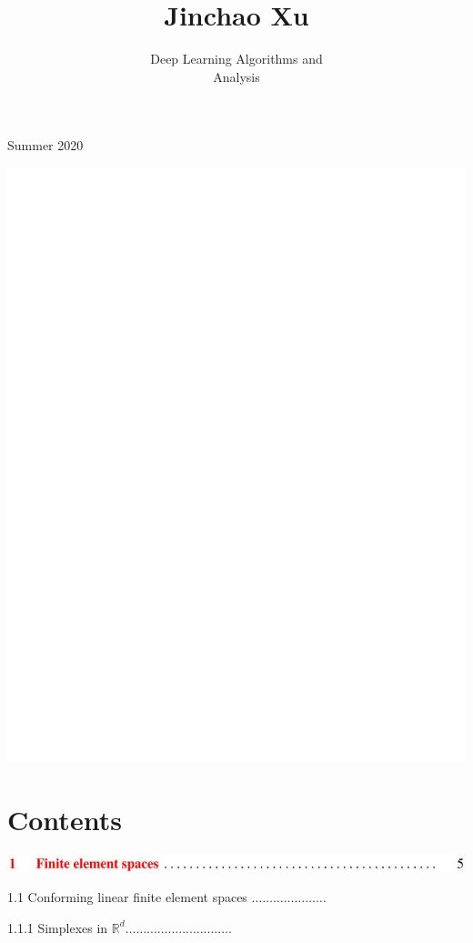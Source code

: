 \documentclass[10pt]{article}
\title{Jinchao Xu }
\author{Deep Learning Algorithms and\\
Analysis}
\date{}
\begin{document}
\maketitle

Summer 2020

\includegraphics[max width=\textwidth]{2022_01_05_15c63bf4a948497c30d9g-02}

\section{Contents}
\includegraphics[max width=\textwidth]{2022_01_05_15c63bf4a948497c30d9g-03}

1.1 Conforming linear finite element spaces $\ldots \ldots \ldots \ldots \ldots \ldots \ldots$

1.1.1 Simplexes in $\mathbb{R}^{d} \ldots \ldots . . . . . . . . . . . . . . . . . . . . . . . .$
\end{document}
